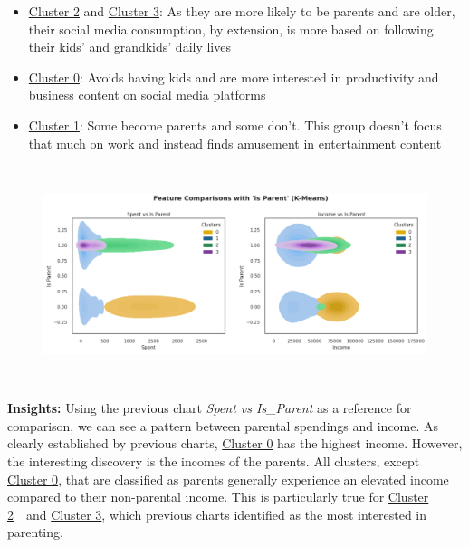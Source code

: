 \documentclass[11pt]{article}
\begin{document}
\begin{itemize}
	\item \uline{\textcolor[HTML]{38761D}{Cluster 2}} and \uline{\textcolor[HTML]{674EA7}{Cluster 3}}: As they are more likely to be parents and are older, their social media consumption, by extension, is more based on following their kids’ and grandkids’ daily lives

	\item \uline{\textcolor[HTML]{BF9000}{Cluster 0}}: Avoids having kids and are more interested in productivity and business content on social media platforms

	\item \uline{\textcolor[HTML]{0B5394}{Cluster 1}}: Some become parents and some don't. This group doesn’t focus that much on work and instead finds amusement in entertainment content

\end{itemize}
\vspace{2\baselineskip}
\begin{figure}[H]
\centering
\includegraphics[width=15.25cm,height=6.36cm]{./images/image31.png}
\end{figure}


\textbf{Insights:} Using the previous chart \textit{Spent vs Is\_Parent} as a reference for comparison, we can see a pattern between parental spendings and income. As clearly established by previous charts, \uline{\textcolor[HTML]{BF9000}{Cluster 0}} has the highest income. However, the interesting discovery is the incomes of the parents. All clusters, except \uline{\textcolor[HTML]{BF9000}{Cluster 0}}, that are classified as parents generally experience an elevated income compared to their non-parental income. This is particularly true for \uline{\textcolor[HTML]{38761D}{Cluster 2}}\ \ and \uline{\textcolor[HTML]{674EA7}{Cluster 3}}, which previous charts identified as the most interested in parenting.
\end{document}
